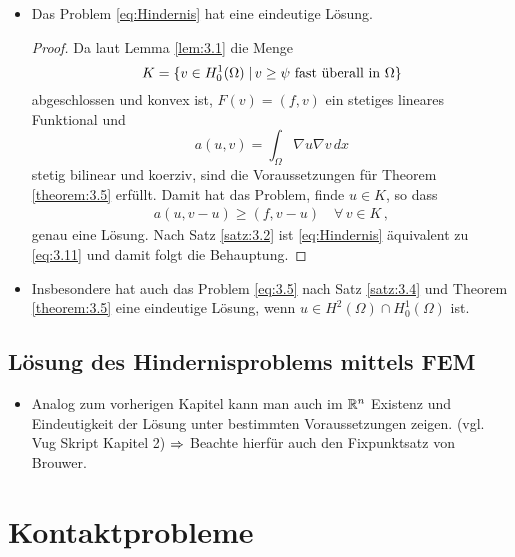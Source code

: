 \begin{itemize}
\begin{proof}
Insgesamt gibt es also für das Problem \eqref{eq:3.7} genau eine  Lösung.
\end{proof}

\item \begin{kor}
Das Problem \eqref{eq:Hindernis} hat eine eindeutige Lösung.
\end{kor}

\begin{proof}
Da laut Lemma \ref{lem:3.1} die Menge 
\[
	K=\{v \in H^1_0(\Omega) \;\vert\, v \ge \psi \text{ fast überall in }\Omega\}
\]
abgeschlossen und konvex ist, $F(v) = (f,v)$ ein stetiges lineares Funktional und 
\[
	a(u,v) = \int_\Omega \nabla u \nabla v \, dx
\]
stetig bilinear und koerziv, sind die Voraussetzungen für Theorem \ref{theorem:3.5} erfüllt. Damit hat das Problem, finde $u \in K$, so dass
\begin{align}\label{eq:3.11}
	a(u,v-u) \ge (f,v-u) \quad \forall \, v \in K \, ,
\end{align}
genau eine Lösung. Nach Satz \ref{satz:3.2} ist \eqref{eq:Hindernis} äquivalent zu \eqref{eq:3.11} und damit folgt die Behauptung.
\end{proof}

\item \begin{bem}
Insbesondere hat auch das Problem \eqref{eq:3.5} nach Satz \ref{satz:3.4} und Theorem \ref{theorem:3.5} eine eindeutige Lösung, wenn $u \in H^2(\Omega) \cap H^1_0(\Omega)$ ist.
\end{bem}
\end{itemize}







\subsection{Lösung des Hindernisproblems mittels FEM}

\begin{itemize}
\item Analog zum vorherigen Kapitel kann man auch im $\mathbb{R}^n$ Existenz und Eindeutigkeit der Lösung unter bestimmten Voraussetzungen zeigen. (vgl. Vug Skript Kapitel 2) $\Rightarrow$ Beachte hierfür auch den Fixpunktsatz von Brouwer.
\end{itemize}


\section{Kontaktprobleme}

